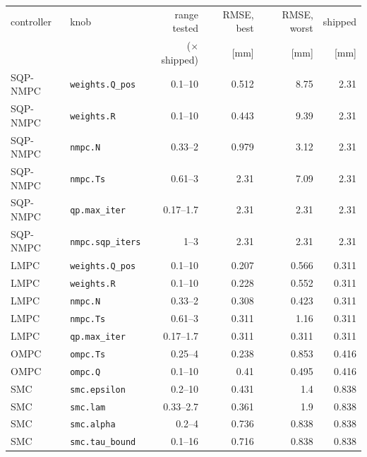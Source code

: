 \begin{tabular}{llrrrr}
\toprule
controller & knob & range tested & RMSE, best & RMSE, worst & shipped \\
 & & ($\times$ shipped) & [mm] & [mm] & [mm] \\
\midrule
SQP-NMPC & \texttt{weights.Q_pos} & 0.1--10 & 0.512 & 8.75 & 2.31 \\
SQP-NMPC & \texttt{weights.R} & 0.1--10 & 0.443 & 9.39 & 2.31 \\
SQP-NMPC & \texttt{nmpc.N} & 0.33--2 & 0.979 & 3.12 & 2.31 \\
SQP-NMPC & \texttt{nmpc.Ts} & 0.61--3 & 2.31 & 7.09 & 2.31 \\
SQP-NMPC & \texttt{qp.max_iter} & 0.17--1.7 & 2.31 & 2.31 & 2.31 \\
SQP-NMPC & \texttt{nmpc.sqp_iters} & 1--3 & 2.31 & 2.31 & 2.31 \\
\addlinespace
LMPC & \texttt{weights.Q_pos} & 0.1--10 & 0.207 & 0.566 & 0.311 \\
LMPC & \texttt{weights.R} & 0.1--10 & 0.228 & 0.552 & 0.311 \\
LMPC & \texttt{nmpc.N} & 0.33--2 & 0.308 & 0.423 & 0.311 \\
LMPC & \texttt{nmpc.Ts} & 0.61--3 & 0.311 & 1.16 & 0.311 \\
LMPC & \texttt{qp.max_iter} & 0.17--1.7 & 0.311 & 0.311 & 0.311 \\
\addlinespace
OMPC & \texttt{ompc.Ts} & 0.25--4 & 0.238 & 0.853 & 0.416 \\
OMPC & \texttt{ompc.Q} & 0.1--10 & 0.41 & 0.495 & 0.416 \\
\addlinespace
SMC & \texttt{smc.epsilon} & 0.2--10 & 0.431 & 1.4 & 0.838 \\
SMC & \texttt{smc.lam} & 0.33--2.7 & 0.361 & 1.9 & 0.838 \\
SMC & \texttt{smc.alpha} & 0.2--4 & 0.736 & 0.838 & 0.838 \\
SMC & \texttt{smc.tau_bound} & 0.1--16 & 0.716 & 0.838 & 0.838 \\
\bottomrule
\end{tabular}
